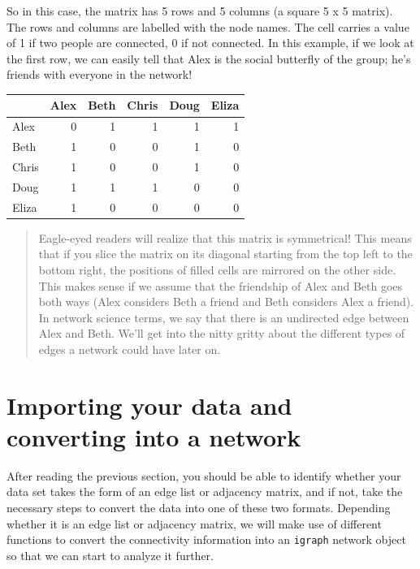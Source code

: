 \documentclass[
]{book}
\begin{document}
So in this case, the matrix has 5 rows and 5 columns (a square 5 x 5 matrix). The rows and columns are labelled with the node names. The cell carries a value of 1 if two people are connected, 0 if not connected. In this example, if we look at the first row, we can easily tell that Alex is the social butterfly of the group; he's friends with everyone in the network!

\begin{table}
\centering
\begin{tabular}{l|r|r|r|r|r}
\hline
  & Alex & Beth & Chris & Doug & Eliza\\
\hline
Alex & 0 & 1 & 1 & 1 & 1\\
\hline
Beth & 1 & 0 & 0 & 1 & 0\\
\hline
Chris & 1 & 0 & 0 & 1 & 0\\
\hline
Doug & 1 & 1 & 1 & 0 & 0\\
\hline
Eliza & 1 & 0 & 0 & 0 & 0\\
\hline
\end{tabular}
\end{table}

\begin{quote}
Eagle-eyed readers will realize that this matrix is symmetrical! This means that if you slice the matrix on its diagonal starting from the top left to the bottom right, the positions of filled cells are mirrored on the other side. This makes sense if we assume that the friendship of Alex and Beth goes both ways (Alex considers Beth a friend and Beth considers Alex a friend). In network science terms, we say that there is an undirected edge between Alex and Beth. We'll get into the nitty gritty about the different types of edges a network could have later on.
\end{quote}

\section{Importing your data and converting into a network}\label{importing-your-data-and-converting-into-a-network}

After reading the previous section, you should be able to identify whether your data set takes the form of an edge list or adjacency matrix, and if not, take the necessary steps to convert the data into one of these two formats. Depending whether it is an edge list or adjacency matrix, we will make use of different functions to convert the connectivity information into an \texttt{igraph} network object so that we can start to analyze it further.
\end{document}
